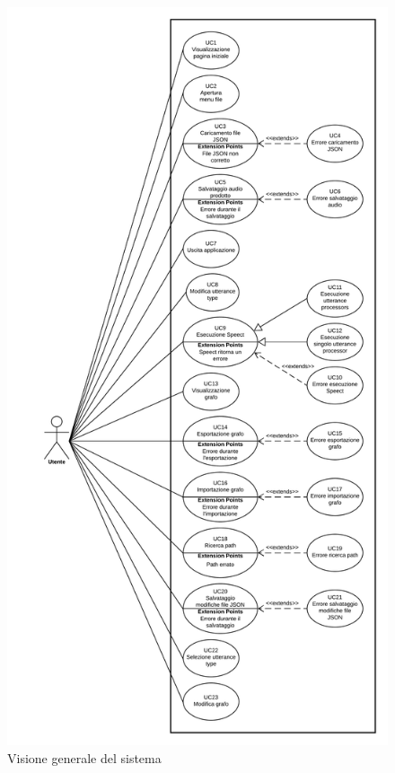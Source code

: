\documentclass[../AnalisideiRequisiti.tex]{subfiles}
\begin{document}
	\begin{figure}[H]
	\centering	
	\includegraphics[scale=0.52]{../img/UC.png}
	
	\caption{Visione generale del sistema}
	
	\end{figure}
 	
\end{document}
